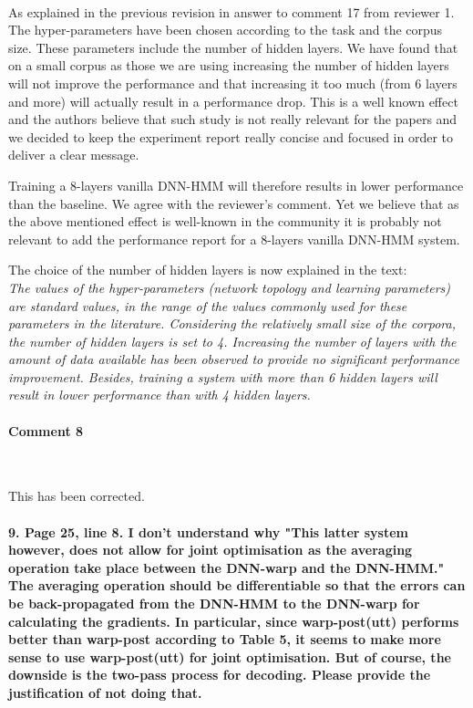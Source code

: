 \documentclass[]{article}
\begin{document}
~

As explained in the previous revision in answer to comment 17 from reviewer 1. The hyper-parameters have been chosen according to the task and the corpus size. These parameters include the number of hidden layers. We have found that on a small corpus as those we are using increasing the number of hidden layers will not improve the performance and that increasing it too much (from 6 layers and more) will actually result in a performance drop. This is a well known effect and the authors believe that such study is not really relevant for the papers and we decided to keep the experiment report really concise and focused in order to deliver a clear message.
 
Training a 8-layers vanilla DNN-HMM will therefore results in lower performance than the baseline. We agree with the reviewer's comment. Yet we believe that as the above mentioned effect is well-known in the community it is probably not relevant to add the performance report for a 8-layers vanilla DNN-HMM system.

The choice of the number of hidden layers is now explained in the text:\\
\textit{The values of the hyper-parameters (network topology and learning parameters) are standard values, in the range of the values commonly used for these parameters in the literature. Considering the relatively small size of the corpora, the number of hidden layers is set to 4. Increasing the number of layers with the amount of data available has been observed to provide no significant performance improvement. Besides, training a system with more than 6 hidden layers will result in lower performance than with 4 hidden layers.}
\paragraph{Comment 8}

~

This has been corrected.

\paragraph{9. Page 25, line 8. I don't understand why "This latter system however, does not allow for joint optimisation as the averaging operation take place between the DNN-warp and the DNN-HMM." The averaging operation should be differentiable so that the errors can be back-propagated from the DNN-HMM to the DNN-warp for calculating the gradients. In particular, since warp-post(utt) performs better than warp-post according to Table 5, it seems to make more sense to use warp-post(utt) for joint optimisation. But of course, the downside is the two-pass process for decoding. Please provide the justification of not doing that.}
\end{document}
